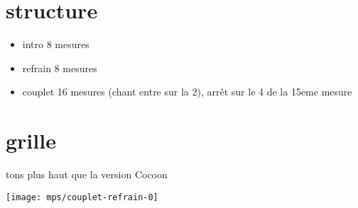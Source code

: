 \documentclass[11pt]{article}
\begin{document}
\makesongtitle


\section{structure}

\begin{itemize}[noitemsep]
	\item     intro 8 mesures
	\item     refrain 8 mesures
	\item     couplet 16 mesures (chant entre sur la 2), arr\^et sur le 4 de la 15eme mesure
\end{itemize}


\section{grille}

\textonehalf{}  tons plus haut que la version Cocoon

\texttt{[image: mps/couplet-refrain-0]}






%    


%    
\end{document}
